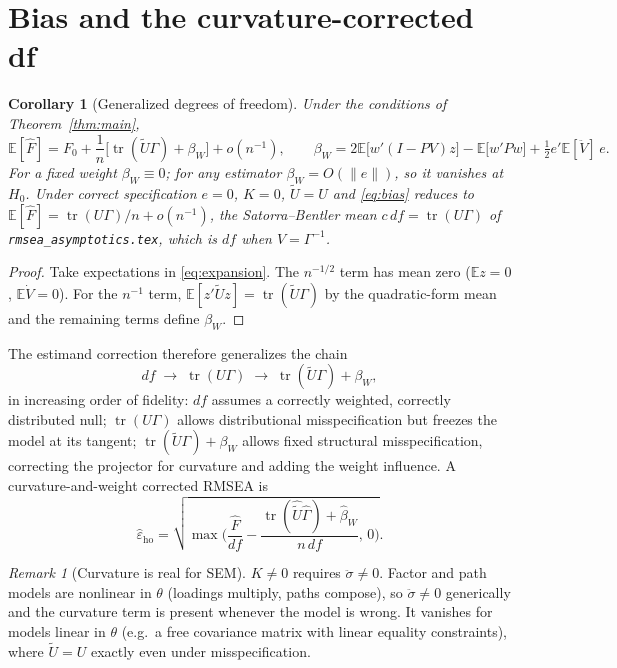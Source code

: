 \documentclass[11pt]{article}
\newcommand{\E}{\mathbb{E}}
\newcommand{\tr}{\operatorname{tr}}
\newcommand{\rmsea}{\widehat{\varepsilon}}
\theoremstyle{plain}
\newtheorem{corollary}{Corollary}
\theoremstyle{remark}
\newtheorem*{remark}{Remark}
\begin{document}
\section{Bias and the curvature-corrected df}

\begin{corollary}[Generalized degrees of freedom]\label{cor:bias}
Under the conditions of Theorem~\ref{thm:main},
\begin{equation}\label{eq:bias}
  \E[\hat F]=F_0+\frac1n\big[\tr(\tilde U\Gamma)+\beta_W\big]+o(n^{-1}),
  \qquad
  \beta_W=2\E\!\big[w'(I-PV)z\big]-\E\!\big[w'Pw\big]+\tfrac12 e'\E[\ddot V]\,e .
\end{equation}
For a fixed weight $\beta_W\equiv0$; for any estimator $\beta_W=O(\|e\|)$, so it
vanishes at $H_0$. Under correct specification $e=0$, $K=0$, $\tilde U=U$ and
\eqref{eq:bias} reduces to $\E[\hat F]=\tr(U\Gamma)/n+o(n^{-1})$, the
Satorra--Bentler mean $c\,df=\tr(U\Gamma)$ of \texttt{rmsea\_asymptotics.tex},
which is $df$ when $V=\Gamma^{-1}$.
\end{corollary}

\begin{proof}
Take expectations in \eqref{eq:expansion}. The $n^{-1/2}$ term has mean zero
($\E z=0$, $\E\dot V=0$). For the $n^{-1}$ term, $\E[z'\tilde Uz]=\tr(\tilde
U\Gamma)$ by the quadratic-form mean and the remaining terms define $\beta_W$.
\end{proof}

The estimand correction therefore generalizes the chain
\[
  df \;\longrightarrow\; \tr(U\Gamma)\;\longrightarrow\;\tr(\tilde U\Gamma)+\beta_W,
\]
in increasing order of fidelity: $df$ assumes a correctly weighted, correctly
distributed null; $\tr(U\Gamma)$ allows distributional misspecification but
freezes the model at its tangent; $\tr(\tilde U\Gamma)+\beta_W$ allows fixed
structural misspecification, correcting the projector for curvature and adding
the weight influence. A curvature-and-weight corrected RMSEA is
\begin{equation}\label{eq:rmseacorr}
  \rmsea_{\mathrm{ho}}
  = \sqrt{\max\!\Big(\frac{\hat F}{df}
      - \frac{\tr(\hat{\tilde U}\hat\Gamma)+\hat\beta_W}{n\,df},\,0\Big)} .
\end{equation}

\begin{remark}[Curvature is real for SEM]
$K\ne0$ requires $\ddot\sigma\ne0$. Factor and path models are nonlinear in
$\theta$ (loadings multiply, paths compose), so $\ddot\sigma\ne0$ generically and
the curvature term is present whenever the model is wrong. It vanishes for models
linear in $\theta$ (e.g.\ a free covariance matrix with linear equality
constraints), where $\tilde U=U$ exactly even under misspecification.
\end{remark}
\end{document}

